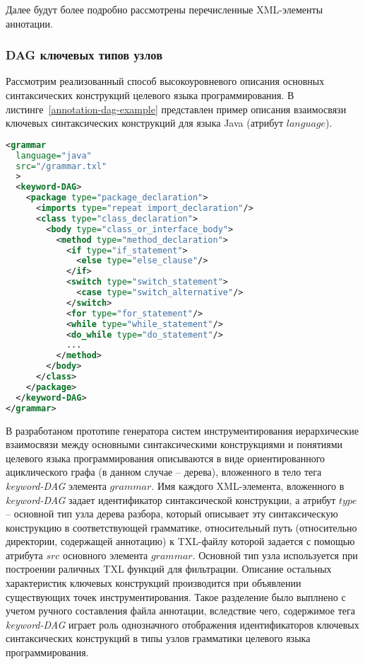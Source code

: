 
Далее будут более подробно рассмотрены перечисленные XML-элементы аннотации.

\subsubsection{DAG ключевых типов узлов}

Рассмотрим реализованный способ высокоуровневого описания основных синтаксических конструкций целевого языка программирования.
В листинге~\ref{annotation-dag-example} представлен пример описания взаимосвязи ключевых синтаксических конструкций для языка Java (атрибут $language$).

\begin{lstlisting}[frame=single, language=XML, label={annotation-dag-example}, caption={Пример DAG для грамматики языка Java}]
<grammar
  language="java"
  src="/grammar.txl"
  >
  <keyword-DAG>
    <package type="package_declaration">
      <imports type="repeat import_declaration"/>
      <class type="class_declaration">
        <body type="class_or_interface_body">
          <method type="method_declaration">
            <if type="if_statement">
              <else type="else_clause"/>
            </if>
            <switch type="switch_statement">
              <case type="switch_alternative"/>
            </switch>
            <for type="for_statement"/>
            <while type="while_statement"/>
            <do_while type="do_statement"/>
            ...
          </method>
        </body>
      </class>
    </package>
  </keyword-DAG>
</grammar>
\end{lstlisting}

В разработаном прототипе генератора систем инструментирования иерархические взаимосвязи между основными синтаксическими конструкциями и понятиями целевого языка программирования описываются в виде ориентированного ациклического графа (в данном случае -- дерева), вложенного в тело тега \textit{keyword-DAG} элемента $grammar$.
Имя каждого XML-элемента, вложенного в \textit{keyword-DAG} задает идентификатор синтаксической конструкции, а атрибут $type$ -- основной тип узла дерева разбора, который описывает эту синтаксическую конструкцию в соответствующей грамматике, относительный путь (относительно директории, содержащей аннотацию) к TXL-файлу которой задается с помощью атрибута $src$ основного элемента $grammar$.
Основной тип узла используется при построении раличных TXL функций для фильтрации.
Описание остальных характеристик ключевых конструкций производится при объявлении существующих точек инструментирования.
Такое разделение было выплнено с учетом ручного составления файла аннотации, вследствие чего, содержимое тега \textit{keyword-DAG} играет роль однозначного отображения идентификаторов ключевых синтаксических конструкций в типы узлов грамматики целевого языка программирования.

